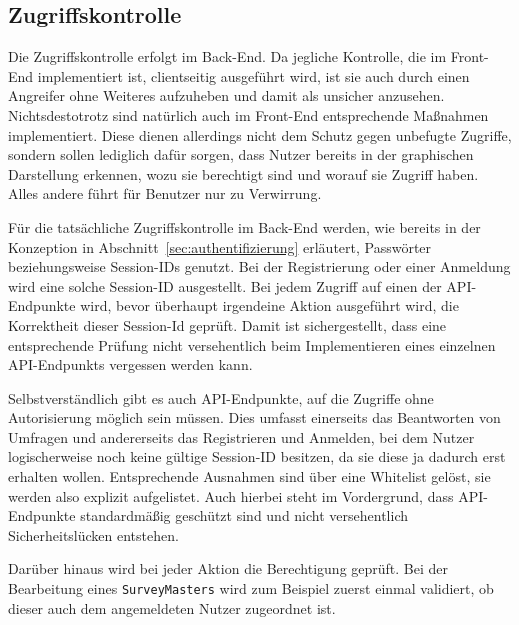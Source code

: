 \subsection{Zugriffskontrolle}
Die Zugriffskontrolle erfolgt im Back-End.
Da jegliche Kontrolle, die im Front-End implementiert ist, clientseitig ausgeführt wird, ist sie auch durch einen Angreifer ohne Weiteres aufzuheben und damit als unsicher anzusehen.
Nichtsdestotrotz sind natürlich auch im Front-End entsprechende Maßnahmen implementiert.
Diese dienen allerdings nicht dem Schutz gegen unbefugte Zugriffe, sondern sollen lediglich dafür sorgen, dass Nutzer bereits in der graphischen Darstellung erkennen, wozu sie berechtigt sind und worauf sie Zugriff haben.
Alles andere führt für Benutzer nur zu Verwirrung.

Für die tatsächliche Zugriffskontrolle im Back-End werden, wie bereits in der Konzeption in Abschnitt~\ref{sec:authentifizierung} erläutert, Passwörter beziehungsweise Session-IDs genutzt.
Bei der Registrierung oder einer Anmeldung wird eine solche Session-ID ausgestellt.
Bei jedem Zugriff auf einen der \acs{API}-Endpunkte wird, bevor überhaupt irgendeine Aktion ausgeführt wird, die Korrektheit dieser Session-Id geprüft.
Damit ist sichergestellt, dass eine entsprechende Prüfung nicht versehentlich beim Implementieren eines einzelnen \acs{API}-Endpunkts vergessen werden kann.

Selbstverständlich gibt es auch \acs{API}-Endpunkte, auf die Zugriffe ohne Autorisierung möglich sein müssen.
Dies umfasst einerseits das Beantworten von Umfragen und andererseits das Registrieren und Anmelden, bei dem Nutzer logischerweise noch keine gültige Session-ID besitzen, da sie diese ja dadurch erst erhalten wollen.
Entsprechende Ausnahmen sind über eine Whitelist gelöst, sie werden also explizit aufgelistet.
Auch hierbei steht im Vordergrund, dass \acs{API}-Endpunkte standardmäßig geschützt sind und nicht versehentlich Sicherheitslücken entstehen.

Darüber hinaus wird bei jeder Aktion die Berechtigung geprüft.
Bei der Bearbeitung eines \texttt{SurveyMasters} wird zum Beispiel zuerst einmal validiert, ob dieser auch dem angemeldeten Nutzer zugeordnet ist.
